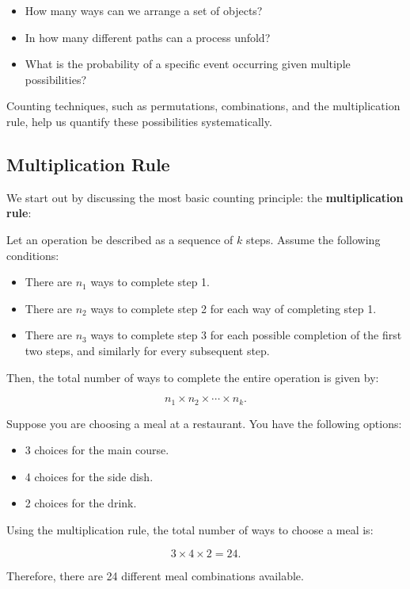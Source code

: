 \begin{itemize}
    \item How many ways can we arrange a set of objects?
    \item In how many different paths can a process unfold?
    \item What is the probability of a specific event occurring given multiple possibilities?
\end{itemize}

Counting techniques, such as permutations, combinations, and the multiplication rule, help us quantify these possibilities systematically.

\subsection*{Multiplication Rule}

We start out by discussing the most basic counting principle: the \textbf{multiplication rule}:

\begin{theorem}
    Let an operation be described as a sequence of $k$ steps. Assume the following conditions:
    
    \begin{itemize}
        \item There are $n_1$ ways to complete step 1.
        \item There are $n_2$ ways to complete step 2 for each way of completing step 1.
        \item There are $n_3$ ways to complete step 3 for each possible completion of the first two steps, and similarly for every subsequent step.
    \end{itemize}
    
    Then, the total number of ways to complete the entire operation is given by:
    
    \[
    n_1 \times n_2 \times \cdots \times n_k.
    \]
\end{theorem}
    
\begin{example}
    Suppose you are choosing a meal at a restaurant. You have the following options:
        
    \begin{itemize}
            \item 3 choices for the main course.
            \item 4 choices for the side dish.
            \item 2 choices for the drink.
    \end{itemize}
        
    Using the multiplication rule, the total number of ways to choose a meal is:
        
    \[
        3 \times 4 \times 2 = 24.
    \]
        
    Therefore, there are 24 different meal combinations available.
\end{example}

